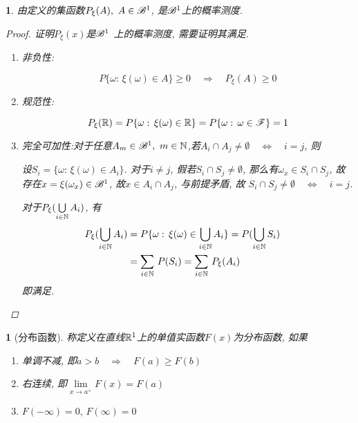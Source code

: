 \newtheorem{measure_of_probability__}[theorem_root]{\theorem}
\begin{measure_of_probability__}
由定义的集函数\(P_{\xi}(A),\,\,A\in\msB^1\), 是\(\msB^1\)上的概率测度.
\begin{proof}
证明\(P_{\xi}(x)\)是\(\msB^1\) 上的概率测度, 需要证明其满足.
\begin{enumerate}
\item 非负性:\par
$$P\{\omega:\,\xi(\omega)\in A\}\ge 0\quad\Longrightarrow\quad P_{\xi}(A)\ge 0$$
\item 规范性:\par
$$P_{\xi}(\Rs) = P\{\omega:\,\xi(\omega)\in\Rs\} = P\{\omega:\,\omega\in\msF\} = 1$$

\item 完全可加性:\quad 对于任意\(A_m\in\msB^1,\,\,m\in\Ns\),若\(A_i\cap A_j \ne\emptyset\quad \Longleftrightarrow\quad i = j\), 则\par
\indent 设\(S_i = \{\omega:\,\xi(\omega)\in A_i\}\). 对于\(i\ne j\), 假若\(S_i\cap S_j\ne\emptyset\), 
那么有\(\omega_x\in S_i\cap S_j\), 故存在\(x = \xi(\omega_x)\in\msB^1\), 故\(x\in A_i\cap A_j\),
与前提矛盾, 故
\(S_i\cap S_j \ne\emptyset\quad \Longleftrightarrow\quad i = j\).

对于\(P_{\xi}(\bigcup\limits_{i\in\Ns}A_i)\), 有
\begin{align}
P_{\xi}(\bigcup\limits_{i\in\Ns}A_i) &= P\{\omega:\,\xi(\omega)\in\bigcup\limits_{i\in\Ns}A_i\} = P(\bigcup\limits_{i\in\Ns}S_i)\cr
&= \sum\limits_{i\in\Ns}\,P(S_i) = \sum\limits_{i\in\Ns}\,P_{\xi}(A_i)
\end{align}
即满足.
\end{enumerate}
\end{proof}
\end{measure_of_probability__}

\newtheorem{distribution_function__}[theorem_root]{}
\newtheorem{probability_distribution}[theorem_root]{}
\begin{distribution_function__}[分布函数]
称定义在直线\(\Rs^1\)上的单值实函数\(F(x)\)为分布函数, 
如果
\begin{enumerate}
\item 单调不减, 即\(a>b\quad\Longrightarrow\quad F(a)\ge F(b)\)
\item 右连续, 即\(\lim\limits_{x\to a^+}F(x) = F(a)\)
\item \(F(-\infty) = 0,\, F(\infty) = 0\)
\end{enumerate}
\end{distribution_function__}

